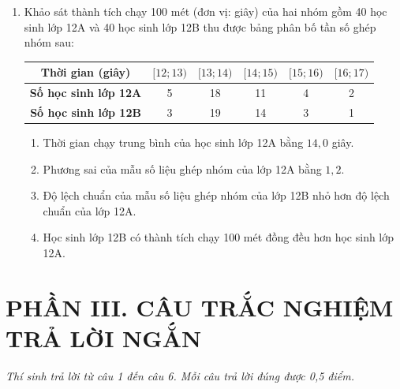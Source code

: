 \documentclass[12pt,a4paper]{article}
\begin{document}
\begin{enumerate}[label=\textbf{Câu \arabic*:}, leftmargin=*]
\begin{minipage}[t]{0.42\linewidth}
{%
}
\end{minipage}

\item Khảo sát thành tích chạy 100 mét (đơn vị: giây) của hai nhóm gồm 40 học sinh lớp 12A và 40 học sinh lớp 12B thu được bảng phân bố tần số ghép nhóm sau:
\begin{center}
\begin{tabular}{|c|c|c|c|c|c|}
\hline
\textbf{Thời gian (giây)} & $[12; 13)$ & $[13; 14)$ & $[14; 15)$ & $[15; 16)$ & $[16; 17)$ \\ \hline
\textbf{Số học sinh lớp 12A} & 5 & 18 & 11 & 4 & 2 \\ \hline
\textbf{Số học sinh lớp 12B} & 3 & 19 & 14 & 3 & 1 \\ \hline
\end{tabular}
\end{center}
\begin{enumerate}[label=\textbf{\alph*)}]
    \item Thời gian chạy trung bình của học sinh lớp 12A bằng $14{,}0$ giây.
    \item Phương sai của mẫu số liệu ghép nhóm của lớp 12A bằng $1{,}2$.
    \item Độ lệch chuẩn của mẫu số liệu ghép nhóm của lớp 12B nhỏ hơn độ lệch chuẩn của lớp 12A.
    \item Học sinh lớp 12B có thành tích chạy 100 mét đồng đều hơn học sinh lớp 12A.
\end{enumerate}

\end{enumerate}

\vspace{0.4cm}
\section*{\large PHẦN III. CÂU TRẮC NGHIỆM TRẢ LỜI NGẮN}
\textit{Thí sinh trả lời từ câu 1 đến câu 6. Mỗi câu trả lời đúng được 0,5 điểm.}
\end{document}
